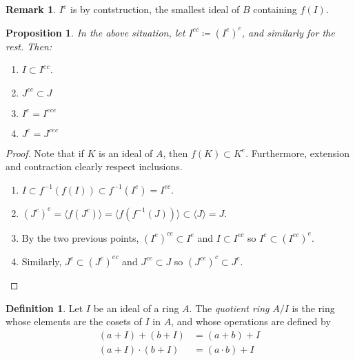 \documentclass[11pt]{article}
\newtheorem{prop}[theorem]{Proposition}
\theoremstyle{definition}
\newtheorem{defn}[theorem]{Definition}
\newtheorem{rk}[theorem]{Remark}
\begin{document}
        \begin{rk}
            $I^{e}$ is by contstruction, the smallest ideal of $B$ containing $f(I)$.
        \end{rk}

        \begin{prop} \label{prop:extension-and-contraction}
            In the above situation, let $I^{ec} \coloneqq (I^e)^c$, and similarly for the rest.
            Then:
            \begin{enumerate}
                \item $I \subset I^{ec}$.
                \item $J^{ce} \subset J$
                \item $I^e = I^{ece}$
                \item $J^c = J^{cec}$
            \end{enumerate}
        \end{prop}

        \begin{proof}
            Note that if $K$ is an ideal of $A$, then $f(K) \subset K^e$.
            Furthermore, extension and contraction clearly respect inclusions.
            \begin{enumerate}
                \item $I \subset f^{-1}(f(I)) \subset f^{-1}(I^e) = I^{ec}$.
                \item $(J^{c})^e = \langle f(J^c) \rangle = \langle f(f^{-1}(J))\rangle \subset \langle J  \rangle = J$.

                \item By the two previous points, $(I^e)^{ce} \subset I^e$ and $I\subset I^{ec}$ so
                $I^e \subset (I^{ec})^e$.

                \item Similarly, $J^c \subset (J^c)^{ec}$ and $J^{ce} \subset J$ so
                $(J^{ce})^c \subset J^c$.
            \end{enumerate}
        \end{proof}

        \begin{defn}
            Let $I$ be an ideal of a ring $A$.
            The \emph{quotient ring} $A/I$ is the ring whose elements are the cosets of $I$ in $A$, and whose operations are defined by
            \begin{align}
                (a + I) + (b + I) &= (a + b) + I \nonumber \\
                (a + I) \cdot (b + I) &= (a \cdot b) + I \nonumber
            \end{align}
        \end{defn}
\end{document}
